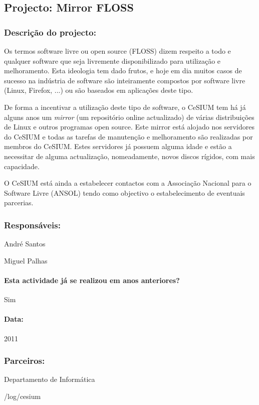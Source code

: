 \subsection{Projecto: Mirror FLOSS} %

\subsubsection*{Descrição do projecto:}
Os termos software livre ou open source (FLOSS) dizem respeito a todo e qualquer software que seja livremente disponibilizado para utilização e melhoramento. Esta ideologia tem dado frutos, e hoje em dia muitos casos de sucesso na indústria de software são inteiramente compostos por software livre (Linux, Firefox, ...) ou são baseados em aplicações deste tipo.

De forma a incentivar a utilização deste tipo de software, o CeSIUM tem há já alguns anos um  \textit{mirror} (um repositório online actualizado) de várias distribuições de Linux e outros programas open source. Este mirror está alojado nos servidores do CeSIUM e todas as tarefas de manutenção e melhoramento são realizadas por membros do CeSIUM. Estes servidores já possuem alguma idade e estão a necessitar de alguma actualização, nomeadamente, novos discos rígidos, com mais capacidade.

O CeSIUM está ainda a estabelecer contactos com a Associação Nacional para o Software Livre (ANSOL) tendo como objectivo o estabelecimento de eventuais parcerias.
\subsubsection*{Responsáveis:}
\begin{itemizedash}
	\item{André Santos}
	\item{Miguel Palhas}
\end{itemizedash}

\paragraph{Esta actividade já se realizou em anos anteriores?}
Sim

\paragraph{Data:} 2011

\subsubsection*{Parceiros:}
\begin{itemizedash}
    \item{Departamento de Informática}
	\item{/log/cesium}
\end{itemizedash}

